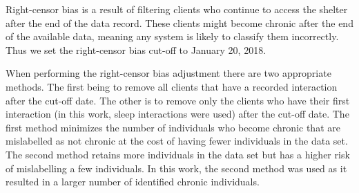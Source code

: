 Right-censor bias is a result of filtering clients who continue to access the shelter after the end of the data record. These clients might become chronic after the end of the available data, meaning any system is likely to classify them incorrectly. Thus we set the right-censor bias cut-off to January 20, 2018.

When performing the right-censor bias adjustment there are two appropriate methods. The first being to remove all clients that have a recorded interaction after the cut-off date. The other is to remove only the clients who have their first interaction (in this work, sleep interactions were used) after the cut-off date. The first method minimizes the number of individuals who become chronic that are mislabelled as not chronic at the cost of having fewer individuals in the data set. The second method retains more individuals in the data set but has a higher risk of mislabelling a few individuals. In this work, the second method was used as it resulted in a larger number of identified chronic individuals.





